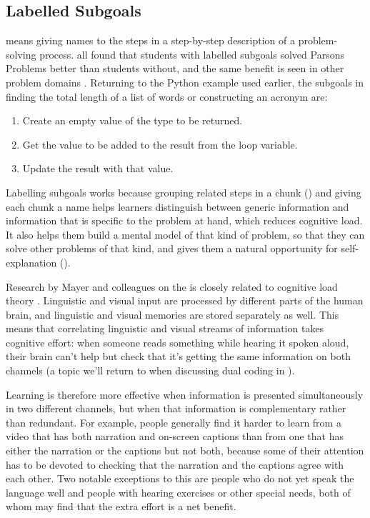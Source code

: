 \subsection*{Labelled Subgoals}

 means giving names
to the steps in a step-by-step description of a problem-solving process.
\cite{Marg2016,Morr2016} all found that students with labelled
subgoals solved Parsons Problems better than students without, and the
same benefit is seen in other problem domains \cite{Marg2012}.
Returning to the Python example used earlier, the subgoals in finding
the total length of a list of words or constructing an acronym are:

\begin{enumerate}
\item
  Create an empty value of the type to be returned.
\item
  Get the value to be added to the result from the loop variable.
\item
  Update the result with that value.
\end{enumerate}

Labelling subgoals works because grouping related steps in a chunk
() and giving each chunk a name helps
learners distinguish between generic information and information that is
specific to the problem at hand, which reduces cognitive load. It also
helps them build a mental model of that kind of problem, so that they
can solve other problems of that kind, and gives them a natural
opportunity for self-explanation ().


Research by Mayer and colleagues on the
 is
closely related to cognitive load theory \cite{Maye2003}. Linguistic
and visual input are processed by different parts of the human brain,
and linguistic and visual memories are stored separately as well. This
means that correlating linguistic and visual streams of information
takes cognitive effort: when someone reads something while hearing it
spoken aloud, their brain can't help but check that it's getting the
same information on both channels (a topic we'll return to when
discussing dual coding in ).

Learning is therefore more effective when information is presented
simultaneously in two different channels, but when that information is
complementary rather than redundant. For example, people generally find
it harder to learn from a video that has both narration and on-screen
captions than from one that has either the narration or the captions but
not both, because some of their attention has to be devoted to checking
that the narration and the captions agree with each other. Two notable
exceptions to this are people who do not yet speak the language well and
people with hearing exercises or other special needs, both of whom may
find that the extra effort is a net benefit.

